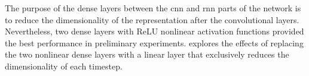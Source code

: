 
The purpose of the dense layers between the \gls{cnn} and
\gls{rnn} parts of the network is to reduce the
dimensionality of the representation after the convolutional
layers. Nevertheless, two dense layers with ReLU nonlinear
activation functions provided the best performance in
preliminary experiments.
 explores the effects
of replacing the two nonlinear dense layers with a linear
layer that exclusively reduces the dimensionality of each
timestep.
